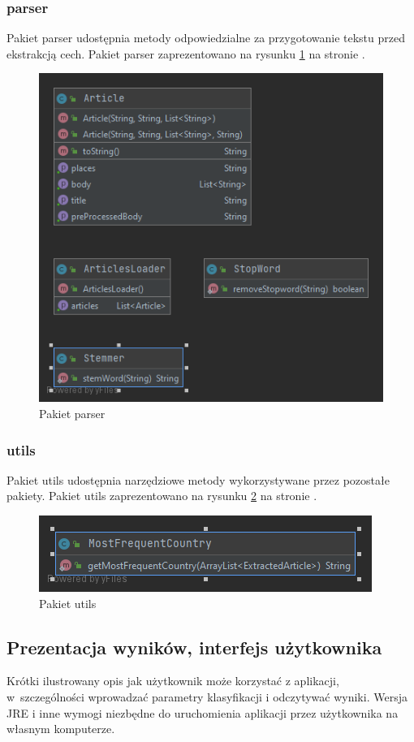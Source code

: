 \documentclass{classrep}
\begin{document}
\subsubsection{parser}
Pakiet parser udostępnia metody odpowiedzialne za przygotowanie tekstu przed ekstrakcją cech. Pakiet parser zaprezentowano na rysunku \ref{prs} na stronie \pageref{prs}.

\begin{figure}
\label{prs}
\includegraphics[scale=0.5]{Package parser}
\caption{Pakiet parser}
\end{figure}


\subsubsection{utils}
Pakiet utils udostępnia narzędziowe metody wykorzystywane przez pozostałe pakiety.  Pakiet utils zaprezentowano na rysunku \ref{utls} na stronie \pageref{utls}.
\begin{figure}
\label{utls}
\includegraphics[scale=0.5]{Package utils}
\caption{Pakiet utils}
\end{figure}

\subsection{Prezentacja wyników, interfejs użytkownika} 
Krótki ilustrowany opis jak użytkownik może korzystać z aplikacji, w~szczególności wprowadzać parametry klasyfikacji i odczytywać wyniki. Wersja JRE i inne wymogi
niezbędne do uruchomienia aplikacji przez użytkownika na własnym komputerze. \\
\end{document}
